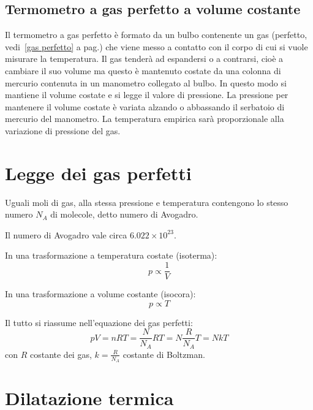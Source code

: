 \subsection{Termometro a gas perfetto a volume costante}
Il termometro a gas perfetto è formato da un bulbo contenente un gas (perfetto, vedi~\ref{gas perfetto} a pag.\@ \pageref{gas perfetto}) che viene messo a contatto con il corpo di cui si vuole misurare la temperatura. Il gas tenderà ad espandersi o a contrarsi, cioè a cambiare il suo volume ma questo è mantenuto costate da una colonna di mercurio contenuta in un manometro collegato al bulbo. In questo modo si mantiene il volume costate e si legge il valore di pressione. La pressione per mantenere il volume costate è variata alzando o abbassando il serbatoio di mercurio del manometro. La temperatura empirica sarà proporzionale alla variazione di pressione del gas.

\section{Legge dei gas perfetti}
\begin{legge}[Avogadro(1811)]
Uguali moli di gas, alla stessa pressione e temperatura contengono lo stesso numero $N_A$ di molecole, detto numero di Avogadro.
\end{legge}
Il numero di Avogadro vale circa $6.022\times 10^{23}$.
\begin{legge}
In una trasformazione a temperatura costate (isoterma):
\begin{equation}
p\propto\frac{1}{V}
\end{equation}
\end{legge}
\begin{legge}
In una trasformazione a volume costante (isocora):
\begin{equation}
p\propto{T}
\end{equation}
\end{legge}
Il tutto si riassume nell'equazione dei gas perfetti:
\begin{equation}
pV=nRT=\frac{N}{N_A}RT=N\frac{R}{N_A}T=NkT
\end{equation}
con $R$ costante dei gas, $k=\frac{R}{N_A}$ costante di Boltzman.
\section{Dilatazione termica}
